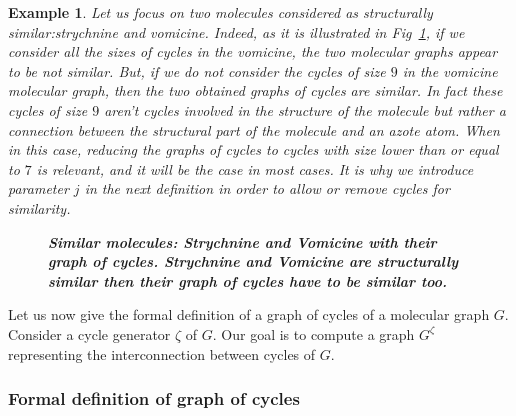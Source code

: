 \documentclass[10pt,letterpaper]{article}
\newtheorem{example}{Example}
\begin{document}
\begin{example}
\label{exp2}
\normalfont
 Let us focus on two molecules considered as structurally similar:strychnine and vomicine. Indeed, as it is illustrated in Fig~\ref{fig4}, if we consider all the sizes of cycles in the vomicine, the two molecular graphs appear to be not similar. But, if we do not consider the cycles of size $9$ in the vomicine molecular graph, then the two obtained graphs of cycles are similar. In fact these cycles of size $9$ aren't cycles involved in the structure of the molecule but rather a connection between the structural part of the molecule and an azote atom. When in this case, reducing the graphs of cycles to cycles with size lower than or equal to $7$ is relevant, and it will be the case in most cases. It is why we introduce parameter $j$ in the next definition in order to allow or remove cycles for similarity.

\begin{figure}[!h]
	\caption{\bf{Similar molecules: Strychnine and Vomicine with their graph of cycles.} 
	Strychnine and Vomicine are structurally similar then their graph of cycles have to be similar too. }
	\label{fig4}
\end{figure}
\end{example}


Let us now give the formal definition of a graph of cycles of a molecular graph $G$. Consider a cycle generator $\zeta$ of $G$. Our goal is to compute a graph $G^\zeta$ representing the interconnection between cycles of $G$.
 
\subsubsection*{Formal definition of graph of cycles}
\end{document}
